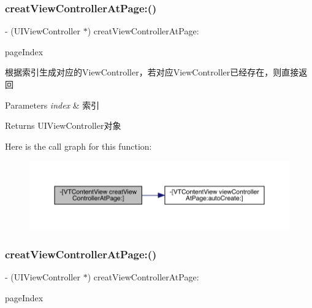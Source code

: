 \subsubsection{\texorpdfstring{creat\+View\+Controller\+At\+Page\+:()}{creatViewControllerAtPage:()}\hspace{0.1cm}{\footnotesize\ttfamily [1/3]}}
{\footnotesize\ttfamily -\/ (U\+I\+View\+Controller $\ast$) creat\+View\+Controller\+At\+Page\+: \begin{DoxyParamCaption}\item[{(N\+S\+U\+Integer)}]{page\+Index }\end{DoxyParamCaption}}

根据索引生成对应的\+View\+Controller，若对应\+View\+Controller已经存在，则直接返回


\begin{DoxyParams}{Parameters}
{\em index} & 索引\\
\hline
\end{DoxyParams}
\begin{DoxyReturn}{Returns}
U\+I\+View\+Controller对象 
\end{DoxyReturn}
Here is the call graph for this function\+:\nopagebreak
\begin{figure}[H]
\begin{center}
\leavevmode
\includegraphics[width=350pt]{interface_v_t_content_view_a40b4f2a5c2a8d8ff7f2ba3ef4e8e9600_cgraph}
\end{center}
\end{figure}
\mbox{\label{interface_v_t_content_view_a40b4f2a5c2a8d8ff7f2ba3ef4e8e9600}} 
\subsubsection{\texorpdfstring{creat\+View\+Controller\+At\+Page\+:()}{creatViewControllerAtPage:()}\hspace{0.1cm}{\footnotesize\ttfamily [2/3]}}
{\footnotesize\ttfamily -\/ (U\+I\+View\+Controller $\ast$) creat\+View\+Controller\+At\+Page\+: \begin{DoxyParamCaption}\item[{(N\+S\+U\+Integer)}]{page\+Index }\end{DoxyParamCaption}}

